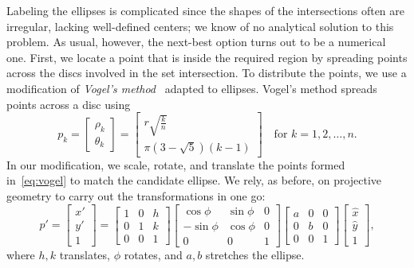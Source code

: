 \documentclass[
  oneside,
  openany,
  numbers=noendperiod,
  parskip=half,
  bibliography=totoc
]{scrbook}\usepackage[]{graphicx}\usepackage{xcolor}
\begin{document}
Labeling the ellipses is complicated since the shapes of the intersections
often are irregular, lacking well-defined centers; we know of no analytical
solution to this problem. As usual, however, the next-best option turns out to
be a numerical one. First, we locate a point that is inside the required region
by spreading points across the discs involved in the set intersection. To
distribute the points, we use a modification of
\emph{Vogel's method}~\citep{Arthur_2015,Vogel_1979} adapted to ellipses.
Vogel's method spreads points across a disc using
\begin{equation}
p_k =
\begin{bmatrix}
  \rho_k \\
  \theta_k
\end{bmatrix} =
\begin{bmatrix}
  r \sqrt{\frac{k}{n}}\\
  \pi (3 - \sqrt{5})(k - 1)
\end{bmatrix}\quad\text{for } k = 1, 2,\dots, n.
\label{eq:vogel}
\end{equation}
In our modification, we scale, rotate, and translate the points formed
in~\eqref{eq:vogel} to match the candidate ellipse. We rely, as before, on
projective geometry to carry out the transformations in one go:
\[
p' =
\begin{bmatrix}
  x' \\
  y' \\
  1
\end{bmatrix} =
\begin{bmatrix}
  1 & 0 & h \\
  0 & 1 & k \\
  0 & 0 & 1
\end{bmatrix}
\begin{bmatrix}
  \cos{\phi}  & \sin{\phi} & 0 \\
  -\sin{\phi} & \cos{\phi} & 0\\
  0           & 0          & 1
\end{bmatrix}
\begin{bmatrix}
  a & 0 & 0 \\
  0 & b & 0 \\
  0 & 0 & 1
\end{bmatrix}
\begin{bmatrix}
  \hat{x} \\
  \hat{y} \\
  1
\end{bmatrix},
\]
where $h,k$ translates, $\phi$ rotates, and
$a,b$ stretches the ellipse.
\end{document}

